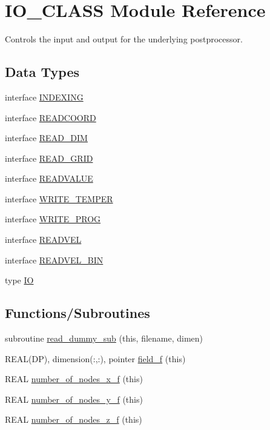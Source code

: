 \hypertarget{namespaceIO__CLASS}{
\section{IO\_\-CLASS Module Reference}
\label{namespaceIO__CLASS}
}


Controls the input and output for the underlying postprocessor.  


\subsection*{Data Types}
\begin{DoxyCompactItemize}
\item 
interface \hyperlink{interfaceIO__CLASS_1_1INDEXING}{INDEXING}
\item 
interface \hyperlink{interfaceIO__CLASS_1_1READCOORD}{READCOORD}
\item 
interface \hyperlink{interfaceIO__CLASS_1_1READ__DIM}{READ\_\-DIM}
\item 
interface \hyperlink{interfaceIO__CLASS_1_1READ__GRID}{READ\_\-GRID}
\item 
interface \hyperlink{interfaceIO__CLASS_1_1READVALUE}{READVALUE}
\item 
interface \hyperlink{interfaceIO__CLASS_1_1WRITE__TEMPER}{WRITE\_\-TEMPER}
\item 
interface \hyperlink{interfaceIO__CLASS_1_1WRITE__PROG}{WRITE\_\-PROG}
\item 
interface \hyperlink{interfaceIO__CLASS_1_1READVEL}{READVEL}
\item 
interface \hyperlink{interfaceIO__CLASS_1_1READVEL__BIN}{READVEL\_\-BIN}
\item 
type \hyperlink{typeIO__CLASS_1_1IO}{IO}
\end{DoxyCompactItemize}
\subsection*{Functions/Subroutines}
\begin{DoxyCompactItemize}
\item 
subroutine \hyperlink{namespaceIO__CLASS_afb3b43393c81d05f437ae1359acf77d2}{read\_\-dummy\_\-sub} (this, filename, dimen)
\item 
REAL(DP), dimension(:,:), pointer \hyperlink{namespaceIO__CLASS_a9fd49cecb24a51f12650f5249285c05f}{field\_\-f} (this)
\item 
REAL \hyperlink{namespaceIO__CLASS_a16514873e600c2fbfde6897a92c88d5e}{number\_\-of\_\-nodes\_\-x\_\-f} (this)
\item 
REAL \hyperlink{namespaceIO__CLASS_a67cf6d63ec2af6429ed8ef6885ac143a}{number\_\-of\_\-nodes\_\-y\_\-f} (this)
\item 
REAL \hyperlink{namespaceIO__CLASS_aa9b327cdca2173b0269ec5007a8ab9f1}{number\_\-of\_\-nodes\_\-z\_\-f} (this)
\end{DoxyCompactItemize}


